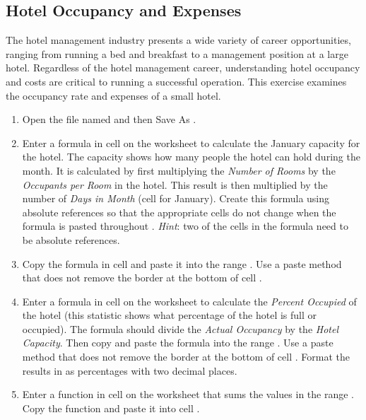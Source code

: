 \subsection{Hotel Occupancy and Expenses}

The hotel management industry presents a wide variety of career opportunities, ranging from running a bed and breakfast to a management position at a large hotel. Regardless of the hotel management career, understanding hotel occupancy and costs are critical to running a successful operation. This exercise examines the occupancy rate and expenses of a small hotel.

\begin{enumerate}
	\item Open the file named  and then Save As .
	
	\item Enter a formula in cell  on the  worksheet to calculate the January capacity for the hotel. The capacity shows how many people the hotel can hold during the month. It is calculated by first multiplying the \textit{Number of Rooms} by the \textit{Occupants per Room} in the hotel. This result is then multiplied by the number of \textit{Days in Month} (cell  for January). Create this formula using absolute references so that the appropriate cells do not change when the formula is pasted throughout . \textit{Hint}: two of the cells in the formula need to be absolute references.
	
	\item Copy the formula in cell  and paste it into the range . Use a paste method that does not remove the border at the bottom of cell .
	
	\item Enter a formula in cell  on the  worksheet to calculate the \textit{Percent Occupied} of the hotel (this statistic shows what percentage of the hotel is full or occupied). The formula should divide the \textit{Actual Occupancy} by the \textit{Hotel Capacity}. Then copy and paste the formula into the range . Use a paste method that does not remove the border at the bottom of cell . Format the results in  as percentages with two decimal places.
	
	\item Enter a function in cell  on the  worksheet that sums the values in the range . Copy the function and paste it into cell .
	

\end{enumerate}
